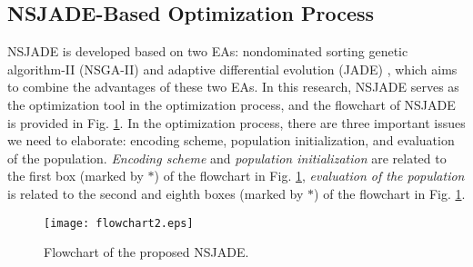 \documentclass[journal]{IEEEtran}
\theoremstyle{definition}
\begin{document}
\subsection{NSJADE-Based Optimization Process}
NSJADE is developed based on two EAs: nondominated sorting genetic algorithm-II (NSGA-II) \cite{deb2002fast} and adaptive differential evolution (JADE) \cite{zhang2009jade}, which aims to combine the advantages of these two EAs. In this research, NSJADE serves as the optimization tool in the optimization process, and the flowchart of NSJADE is provided in Fig. \ref{flchart}. In the optimization process, there are three important issues we need to elaborate: encoding scheme, population initialization, and evaluation of the population. \emph{Encoding scheme} and \emph{population initialization} are related to the first box (marked by $\ast$) of the flowchart in Fig. \ref{flchart}, \emph{evaluation of the population} is related to the second and eighth boxes (marked by $\ast$) of the flowchart in Fig. \ref{flchart}.
\begin{figure}[!htbp]
\begin{minipage}[t]{1\linewidth}
\centering
\texttt{[image: flowchart2.eps]}
\caption{Flowchart of the proposed NSJADE.} \label{flchart}
\end{minipage}
\end{figure}
\end{document}
